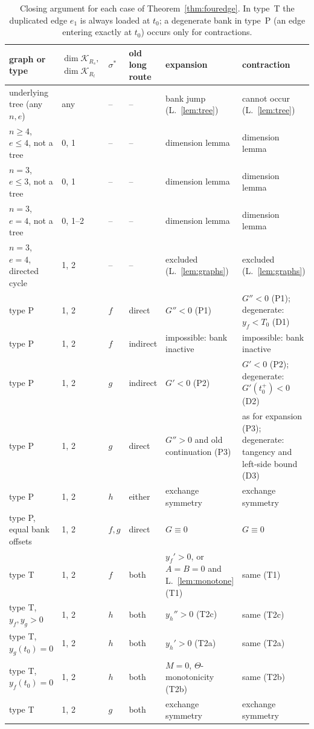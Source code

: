 \begin{table}[ht]
\centering\footnotesize
\begin{tabular}{@{}p{3.1cm}p{1.2cm}p{0.5cm}p{1.3cm}p{3.6cm}p{3.6cm}@{}}
\hline
graph or type & $\dim\mathcal K_{R_s},$ $\dim\mathcal K_{R_l}$ & $\sigma^*$ & old long route & expansion & contraction\\
\hline
underlying tree (any $n,e$) & any & -- & -- & bank jump (L.~\ref{lem:tree}) & cannot occur (L.~\ref{lem:tree})\\
$n\ge4$, $e\le4$, not a tree & 0, 1 & -- & -- & dimension lemma & dimension lemma\\
$n=3$, $e\le3$, not a tree & 0, 1 & -- & -- & dimension lemma & dimension lemma\\
$n=3$, $e=4$, not a tree & 0, 1--2 & -- & -- & dimension lemma & dimension lemma\\
$n=3$, $e=4$, directed cycle & 1, 2 & -- & -- & excluded (L.~\ref{lem:graphs}) & excluded (L.~\ref{lem:graphs})\\
\hline
type P & 1, 2 & $f$ & direct & $G''<0$ (P1) & $G''<0$ (P1); degenerate: $y_f<T_0$ (D1)\\
type P & 1, 2 & $f$ & indirect & impossible: bank inactive & impossible: bank inactive\\
type P & 1, 2 & $g$ & indirect & $G'<0$ (P2) & $G'<0$ (P2); degenerate: $G'(t_0^+)<0$ (D2)\\
type P & 1, 2 & $g$ & direct & $G''>0$ and old continuation (P3) & as for expansion (P3); degenerate: tangency and left-side bound (D3)\\
type P & 1, 2 & $h$ & either & exchange symmetry & exchange symmetry\\
type P, equal bank offsets & 1, 2 & $f,g$ & direct & $G\equiv0$ & $G\equiv0$\\
\hline
type T & 1, 2 & $f$ & both & $y_f'>0$, or $A=B=0$ and L.~\ref{lem:monotone} (T1) & same (T1)\\
type T, $y_f,y_g>0$ & 1, 2 & $h$ & both & $y_h''>0$ (T2c) & same (T2c)\\
type T, $y_g(t_0)=0$ & 1, 2 & $h$ & both & $y_h'>0$ (T2a) & same (T2a)\\
type T, $y_f(t_0)=0$ & 1, 2 & $h$ & both & $M=0$, $\Theta$-monotonicity (T2b) & same (T2b)\\
type T & 1, 2 & $g$ & both & exchange symmetry & exchange symmetry\\
\hline
\end{tabular}
\caption{Closing argument for each case of Theorem~\ref{thm:fouredge}.
In type~T the duplicated edge $e_1$ is always loaded at $t_0$; a degenerate
bank in type~P (an edge entering exactly at $t_0$) occurs only for
contractions.}
\label{tab:minimality}
\end{table}

